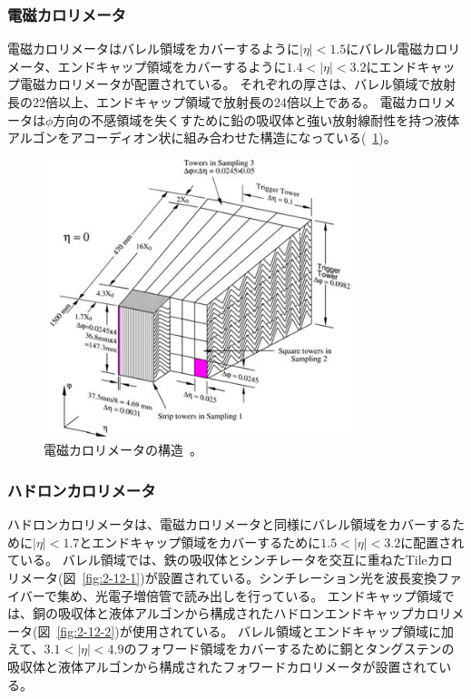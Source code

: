 \subsubsection{電磁カロリメータ}
電磁カロリメータはバレル領域をカバーするように$|\eta|<1.5$にバレル電磁カロリメータ、エンドキャップ領域をカバーするように$1.4<|\eta|<3.2$にエンドキャップ電磁カロリメータが配置されている。
それぞれの厚さは、バレル領域で放射長の22倍以上、エンドキャップ領域で放射長の24倍以上である。
電磁カロリメータは$\phi$方向の不感領域を失くすために鉛の吸収体と強い放射線耐性を持つ液体アルゴンをアコーディオン状に組み合わせた構造になっている(~\ref{fig:2-11})。


\begin{figure}[h]
  \centering
  \includegraphics[clip, width=9cm]{fig/2/electoricCal.jpg}
  \caption{電磁カロリメータの構造~\cite{Aad:1129811}。}
  \label{fig:2-11}
\end{figure}

\subsubsection{ハドロンカロリメータ}
ハドロンカロリメータは、電磁カロリメータと同様にバレル領域をカバーするために$|\eta|<1.7$とエンドキャップ領域をカバーするために$1.5<|\eta|<3.2$に配置されている。
バレル領域では、鉄の吸収体とシンチレータを交互に重ねたTileカロリメータ(図~\ref{fig:2-12-1})が設置されている。シンチレーション光を波長変換ファイバーで集め、光電子増倍管で読み出しを行っている。
エンドキャップ領域では、銅の吸収体と液体アルゴンから構成されたハドロンエンドキャップカロリメータ(図~\ref{fig:2-12-2})が使用されている。
バレル領域とエンドキャップ領域に加えて、$3.1<|\eta|<4.9$のフォワード領域をカバーするために銅とタングステンの吸収体と液体アルゴンから構成されたフォワードカロリメータが設置されている。

